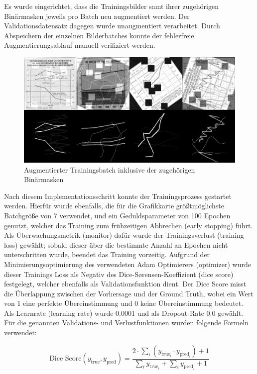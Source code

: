Es wurde eingerichtet, dass die Trainingsbilder samt ihrer zugehörigen Binärmasken jeweils pro Batch neu augmentiert werden. Der Validationsdatensatz dagegen wurde unaugmentiert verarbeitet. Durch Abspeichern der einzelnen Bilderbatches konnte der fehlerfreie Augmentierungsablauf manuell verifiziert werden.

\begin{figure}[H]
    \centering
    \captionsetup{width=.75\linewidth}
    \includegraphics[width=.75\textwidth]{Implementation/img/unet_training.png}
    \caption{ Augmentierter Trainingsbatch inklusive der zugehörigen Binärmasken}
    \label{fig:unet_training}
\end{figure}

Nach diesem Implementationsschritt konnte der Trainingsprozess gestartet werden. Hierfür wurde ebenfalls, die für die Grafikkarte größtmöglichste Batchgröße von 7 verwendet, und ein Geduldsparameter von 100 Epochen genutzt, welcher das Training zum frühzeitigen Abbrechen (early stopping) führt. Als Überwachungsmetrik (monitor) dafür wurde der Trainingsverlust (training loss) gewählt; sobald dieser über die bestimmte Anzahl an Epochen nicht unterschritten wurde, beendet das Training vorzeitig. Aufgrund der Minimierungsoptimierung des verwendeten Adam Optimierers (optimizer) \cite{kingma2017adammethodstochasticoptimization} wurde dieser Trainings Loss als Negativ des Dice-Sørensen-Koeffizient (dice score) festgelegt, welcher ebenfalls als Validationsfunktion dient. Der Dice Score misst die Überlappung zwischen der Vorhersage und der Ground Truth, wobei ein Wert von 1 eine perfekte Übereinstimmung und 0 keine Übereinstimmung bedeutet. Als Learnrate (learning rate) wurde 0.0001 und als Dropout-Rate 0.0 gewählt. Für die genannten Validations- und Verlustfunktionen wurden folgende Formeln verwendet:

\begin{equation}
    \text{Dice Score}(y_{\text{true}}, y_{\text{pred}}) = \frac{2 \cdot \sum_{i} (y_{\text{true}_i} \cdot y_{\text{pred}_i}) + 1}{\sum_{i} y_{\text{true}_i} + \sum_{i} y_{\text{pred}_i} + 1} \nonumber
\end{equation}

